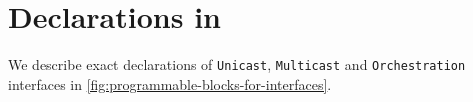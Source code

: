 \documentclass[letterpaper,twocolumn,10pt]{article}
\begin{document}




\appendix
\section{Declarations in \uarch}
\label{appendix:section:micro-switch-architecture}
We describe exact declarations of \texttt{Unicast}, 
\texttt{Multicast} and \texttt{Orchestration} interfaces in 
\cref{fig:programmable-blocks-for-interfaces}. 

%   
\end{document}
